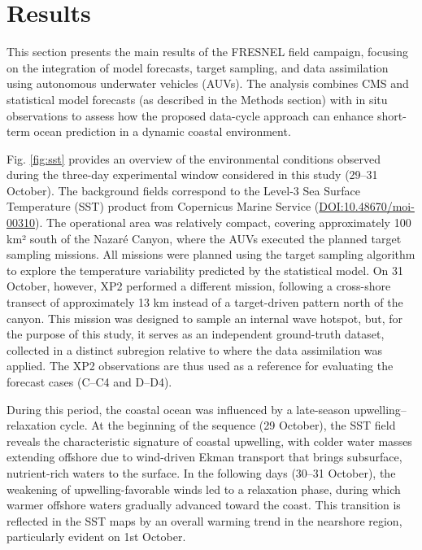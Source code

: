 \section{Results}
\label{sec:results}

This section presents the main results of the FRESNEL field campaign,
focusing on the integration of model forecasts, target sampling, and
data assimilation using autonomous underwater vehicles (AUVs). The
analysis combines CMS and statistical model forecasts (as described
in the Methods section) with in situ observations to assess how the
proposed data-cycle approach can enhance short-term ocean prediction
in a dynamic coastal environment.

Fig. \ref{fig:sst} provides an overview of the environmental conditions
observed during the three-day experimental window considered in this
study (29–31 October). The background fields correspond to the Level-3
Sea Surface Temperature (SST) product from Copernicus Marine Service
(\url{DOI:10.48670/moi-00310}). The operational area was relatively
compact, covering approximately 100 km² south of the Nazaré Canyon,
where the AUVs executed the planned target sampling missions. All
missions were planned using the target sampling algorithm to explore the
temperature variability predicted by the statistical model. On 31
October, however, XP2 performed a different mission, following a
cross-shore transect of approximately 13 km instead of a target-driven
pattern north of the canyon. This mission was designed to sample an
internal wave hotspot, but, for the purpose of this study, it serves as
an independent ground-truth dataset, collected in a distinct subregion
relative to where the data assimilation was applied. The XP2
observations are thus used as a reference for evaluating the forecast
cases (C–C4 and D–D4).

During this period, the coastal ocean was influenced by a late-season
upwelling–relaxation cycle. At the beginning of the sequence (29
October), the SST field reveals the characteristic signature of coastal
upwelling, with colder water masses extending offshore due to
wind-driven Ekman transport that brings subsurface, nutrient-rich waters
to the surface. In the following days (30–31 October), the weakening of
upwelling-favorable winds led to a relaxation phase, during which warmer
offshore waters gradually advanced toward the coast. This transition is
reflected in the SST maps by an overall warming trend in the nearshore
region, particularly evident on 1st October.

